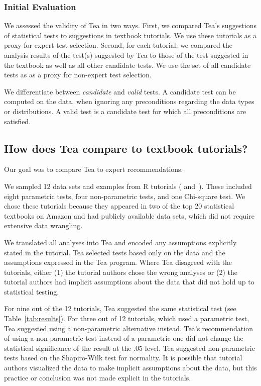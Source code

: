 
\vspace{-5pt}
\subsubsection{Initial Evaluation} \label{sec:eval}
We assessed the validity of Tea in two ways. First, we compared Tea's
suggestions of statistical tests to suggestions in textbook tutorials.
We use these tutorials as a proxy for expert test selection.
Second, for each tutorial, we compared the analysis results of the test(s)
suggested by Tea to those of the test suggested in the textbook as well as all
other candidate tests. We use the set of all candidate tests as as a proxy for
non-expert test selection.

We differentiate between \textit{candidate} and \textit{valid} tests. A candidate test can be
computed on the data, when ignoring any preconditions regarding the data types or
distributions. A valid test is a candidate test for which all preconditions are
satisfied.

\vspace{-3pt}
\subsection{How does Tea compare to textbook tutorials?}
Our goal was to compare Tea to expert recommendations.

We sampled 12 data sets and examples from R tutorials (\cite{kabacoff2011action}
and~\cite{field2012discoveringR}). These included eight parametric tests, four
non-parametric tests, and one Chi-square test. We chose these tutorials because they
appeared in two of the top 20 statistical textbooks on Amazon and had publicly available
data sets, which did not require extensive data wrangling.

We translated all analyses into Tea and encoded any assumptions explicitly
stated in the tutorial. Tea selected tests based only on the data and the
assumptions expressed in the Tea program. Where Tea disagreed with the
tutorials, either (1) the tutorial authors chose the wrong analyses or (2) the tutorial authors
had implicit assumptions about the data that did not hold up to statistical testing. 

For nine out of the 12 tutorials, Tea suggested the same statistical test (see
Table~\ref{tab:results}). For three out of 12 tutorials, which used a parametric
test, Tea suggested using a non-parametric alternative instead. Tea's
recommendation of using a non-parametric test instead of a parametric one did
not change the statistical significance of the result at the $.05$ level. Tea
suggested non-parametric tests based on the Shapiro-Wilk test for normality. It
is possible that tutorial authors visualized the data to make implicit
assumptions about the data, but this practice or conclusion was not made
explicit in the tutorials.

